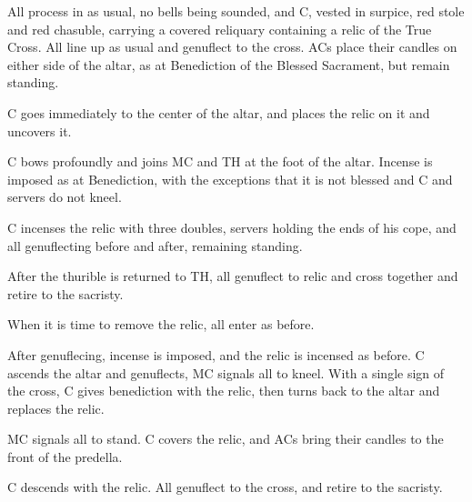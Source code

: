 {    \rubric All process in as usual, no bells being sounded, and C, vested in
    surpice, red stole and red chasuble, carrying a covered reliquary
    containing a relic of the True Cross. All line up as usual and genuflect to
    the cross. ACs place their candles on either side of the altar, as at
    Benediction of the Blessed Sacrament, but remain standing.

    \rubric C goes immediately to the center of the altar, and places the relic
    on it and uncovers it.

    \rubric C bows profoundly and joins MC and TH at the foot of the altar.
    Incense is imposed as at Benediction, with the exceptions that it is not
    blessed and C and servers do not kneel.

    \rubric C incenses the relic with three doubles, servers holding the ends
    of his cope, and all genuflecting before and after, remaining standing.

    \rubric After the thurible is returned to TH, all genuflect to relic and
    cross together and retire to the sacristy.

    \rubric When it is time to remove the relic, all enter as before.

    \rubric After genuflecing, incense is imposed, and the relic is incensed as
    before. C ascends the altar and genuflects, MC signals all to kneel. With a
    single sign of the cross, C gives benediction with the relic, then turns
    back to the altar and replaces the relic.

    \rubric MC signals all to stand. C covers the relic, and ACs bring their
    candles to the front of the predella.

    \rubric C descends with the relic. All genuflect to the cross, and retire
    to the sacristy.

}

